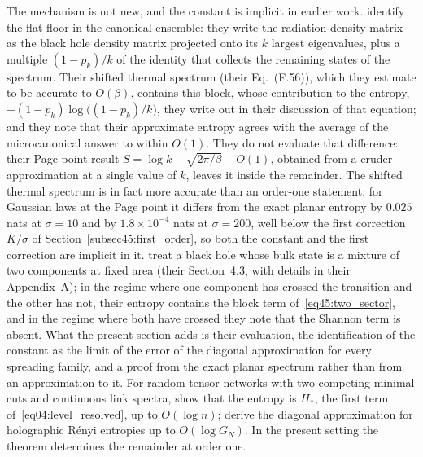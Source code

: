 \documentclass[11pt,letterpaper]{article}
\theoremstyle{plain}
\theoremstyle{definition}
\theoremstyle{remark}
\begin{document}
The mechanism is not new, and the constant is implicit in earlier work. \citet{pssyetal2022} identify the flat floor in the canonical ensemble: they write the radiation density matrix as the black hole density matrix projected onto its $k$ largest eigenvalues, plus a multiple $(1 - p_k)/k$ of the identity that collects the remaining states of the spectrum. Their shifted thermal spectrum (their Eq.~(F.56)), which they estimate to be accurate to $O(\beta)$, contains this block, whose contribution to the entropy, $-(1 - p_k)\log\big((1-p_k)/k\big)$, they write out in their discussion of that equation; and they note that their approximate entropy agrees with the average of the microcanonical answer to within $O(1)$. They do not evaluate that difference: their Page-point result $S = \log k - \sqrt{2\pi/\beta} + O(1)$, obtained from a cruder approximation at a single value of $k$, leaves it inside the remainder. The shifted thermal spectrum is in fact more accurate than an order-one statement: for Gaussian laws at the Page point it differs from the exact planar entropy by $0.025$ nats at $\sigma = 10$ and by $1.8\times10^{-4}$ nats at $\sigma = 200$, well below the first correction $K/\sigma$ of Section~\ref{subsec45:first_order}, so both the constant and the first correction are implicit in it. \citet{akerspenington2021} treat a black hole whose bulk state is a mixture of two components at fixed area (their Section~4.3, with details in their Appendix~A); in the regime where one component has crossed the transition and the other has not, their entropy contains the block term of~\eqref{eq45:two_sector}, and in the regime where both have crossed they note that the Shannon term is absent. What the present section adds is their evaluation, the identification of the constant as the limit of the error of the diagonal approximation for every spreading family, and a proof from the exact planar spectrum rather than from an approximation to it. For random tensor networks with two competing minimal cuts and continuous link spectra, \citet{chengetal2024} show that the entropy is $H_*$, the first term of~\eqref{eq04:level_resolved}, up to $O(\log n)$; \citet{peningtonrath2025} derive the diagonal approximation for holographic R\'enyi entropies up to $O(\log G_N)$. In the present setting the theorem determines the remainder at order one.
\end{document}
